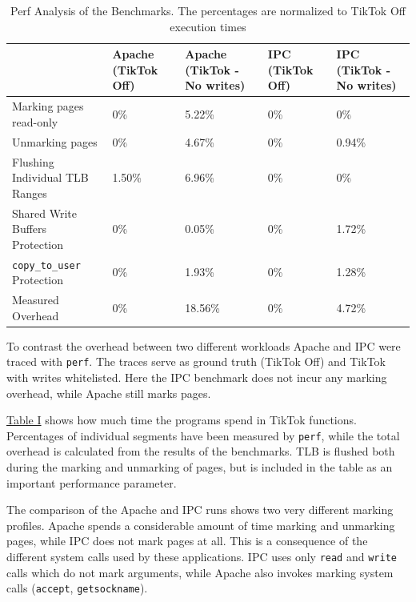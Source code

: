 \documentclass[conference]{IEEEtran}
\newcommand{\sysname}{TikTok}
\begin{document}
\begin{table}[]
  \label{perftable}
  \centering
  \begin{tabular}{|l|l|l|l|l|}
  \hline
                                     & Apache (\sysname{} Off) & Apache (\sysname{} - No writes) & IPC (\sysname{} Off) & IPC (\sysname{} - No writes)\\ \hline
  Marking pages read-only            & 0\%    & 5.22\%          & 0\% & 0\%         \\ \hline
  Unmarking pages                    & 0\%    & 4.67\%          & 0\% & 0.94\%      \\ \hline
  Flushing Individual TLB Ranges     & 1.50\% & 6.96\%          & 0\% & 0\%         \\ \hline
  Shared Write Buffers Protection    & 0\%    & 0.05\%          & 0\% & 1.72\%      \\ \hline
  \texttt{copy\_to\_user} Protection & 0\%    & 1.93\%          & 0\% & 1.28\%      \\ \hline
  Measured Overhead                  & 0\%    & 18.56\%         & 0\% & 4.72\%      \\ \hline
  \end{tabular}
  \caption{Perf Analysis of the Benchmarks. The percentages are normalized to \sysname{} Off execution times}
\end{table}

To contrast the overhead between two different workloads Apache and IPC were
traced with \texttt{perf}. The traces serve as ground truth
(\sysname{} Off) and \sysname{} with writes whitelisted. Here the IPC benchmark
does not incur any marking overhead, while Apache still marks pages.

\hyperref[perftable]{Table I} shows how much time the programs spend in
\sysname{} functions. Percentages of individual segments have been measured by
\texttt{perf}, while the total overhead is calculated from the results of the
benchmarks. TLB is flushed both during the marking and unmarking of
pages, but is included in the table as an important performance parameter.

The comparison of the Apache and IPC runs shows two very different marking
profiles. Apache spends a considerable amount of time marking and unmarking
pages, while IPC does not mark pages at all. This is a consequence of the
different system calls used by these applications. IPC uses only \texttt{read}
and \texttt{write} calls which do not mark arguments, while Apache also invokes
marking system calls (\texttt{accept}, \texttt{getsockname}).
\end{document}
